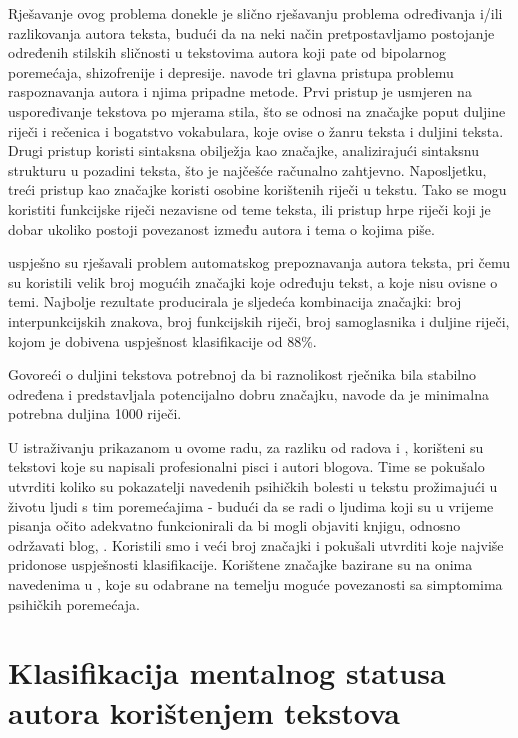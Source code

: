 \documentclass[10pt, a4paper]{article}
\begin{document}
Rješavanje ovog problema donekle je slično rješavanju problema određivanja i/ili razlikovanja autora teksta, budući da na neki način pretpostavljamo postojanje određenih stilskih sličnosti u tekstovima autora koji pate od bipolarnog poremećaja, shizofrenije i depresije. \citet{coyotl} navode tri glavna pristupa problemu raspoznavanja autora i njima pripadne metode. Prvi pristup je usmjeren na uspoređivanje tekstova po mjerama stila, što se odnosi na značajke poput duljine riječi i rečenica i bogatstvo vokabulara, koje ovise o žanru teksta i duljini teksta. Drugi pristup koristi sintaksna obilježja kao značajke, analizirajući sintaksnu strukturu u pozadini teksta, što je najčešće računalno zahtjevno. Naposljetku, treći pristup kao značajke koristi osobine korištenih riječi u tekstu. Tako se mogu koristiti funkcijske riječi nezavisne od teme teksta, ili pristup hrpe riječi koji je dobar ukoliko postoji povezanost između autora i tema o kojima piše.

\citet{kristo} uspješno su rješavali problem automatskog prepoznavanja autora teksta, pri čemu su koristili velik broj mogućih značajki koje određuju tekst, a koje nisu ovisne o temi. Najbolje rezultate producirala je sljedeća kombinacija značajki: broj interpunkcijskih znakova, broj funkcijskih riječi, broj samoglasnika i duljine riječi, kojom je dobivena uspješnost klasifikacije od 88\%.

Govoreći o duljini tekstova potrebnoj da bi raznolikost rječnika bila stabilno određena i predstavljala potencijalno dobru značajku, \citet{tweedie} navode da je minimalna potrebna duljina 1000 riječi.

U istraživanju prikazanom u ovome radu, za razliku od radova \citep{strous-2009} i \citep{exray}, korišteni su tekstovi koje su napisali profesionalni pisci i autori blogova. Time se pokušalo utvrditi koliko su pokazatelji navedenih psihičkih bolesti u tekstu prožimajući u životu ljudi s tim poremećajima - budući da se radi o ljudima koji su u vrijeme pisanja očito adekvatno funkcionirali da bi mogli objaviti knjigu, odnosno održavati blog, . Koristili smo i veći broj značajki i pokušali utvrditi koje najviše pridonose uspješnosti klasifikacije. Korištene značajke bazirane su na onima navedenima u \citep{kristo}, koje su odabrane na temelju moguće povezanosti sa simptomima psihičkih poremećaja.


\section{Klasifikacija mentalnog statusa autora korištenjem tekstova}
\end{document}
